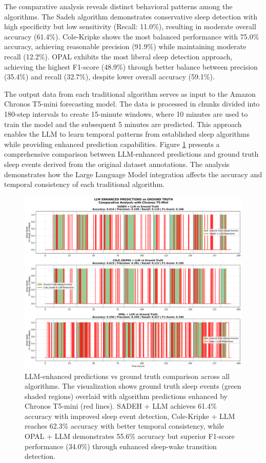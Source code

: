 \documentclass[conference]{IEEEtran}
\begin{document}
The comparative analysis reveals distinct behavioral patterns among the algorithms. The Sadeh algorithm demonstrates conservative sleep detection with high specificity but low sensitivity (Recall: 11.0\%), resulting in moderate overall accuracy (61.4\%). Cole-Kripke shows the most balanced performance with 75.0\% accuracy, achieving reasonable precision (91.9\%) while maintaining moderate recall (12.2\%). OPAL exhibits the most liberal sleep detection approach, achieving the highest F1-score (48.9\%) through better balance between precision (35.4\%) and recall (32.7\%), despite lower overall accuracy (59.1\%).

The output data from each traditional algorithm serves as input to the Amazon Chronos T5-mini forecasting model. The data is processed in chunks divided into 180-step intervals to create 15-minute windows, where 10 minutes are used to train the model and the subsequent 5 minutes are predicted. This approach enables the LLM to learn temporal patterns from established sleep algorithms while providing enhanced prediction capabilities. Figure \ref{fig:llm_comparison_results} presents a comprehensive comparison between LLM-enhanced predictions and ground truth sleep events derived from the original dataset annotations. The analysis demonstrates how the Large Language Model integration affects the accuracy and temporal consistency of each traditional algorithm.

\begin{figure}[htbp]
	\centering
	\includegraphics[width=0.95\columnwidth]{llm_comparison_results.png}
	\caption{LLM-enhanced predictions vs ground truth comparison across all algorithms. The visualization shows ground truth sleep events (green shaded regions) overlaid with algorithm predictions enhanced by Chronos T5-mini (red lines). SADEH + LLM achieves 61.4\% accuracy with improved sleep event detection, Cole-Kripke + LLM reaches 62.3\% accuracy with better temporal consistency, while OPAL + LLM demonstrates 55.6\% accuracy but superior F1-score performance (34.0\%) through enhanced sleep-wake transition detection.}
	\label{fig:llm_comparison_results}
\end{figure}
\end{document}
